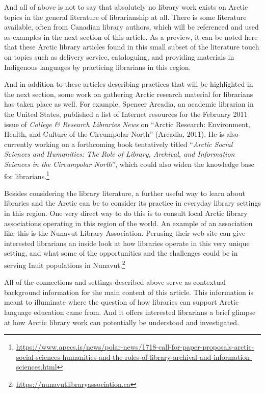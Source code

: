 \documentclass[a4paper,
fontsize=11pt,
oneside,
numbers=noperiodatend,
parskip=half-,
bibliography=totoc,
final
]{scrartcl}
\begin{document}
And all of above is not to say that absolutely no library work exists on
Arctic topics in the general literature of librarianship at all. There
is some literature available, often from Canadian library authors, which
will be referenced and used as examples in the next section of this
article. As a preview, it can be noted here that these Arctic library
articles found in this small subset of the literature touch on topics
such as delivery service, cataloguing, and providing materials in
Indigenous languages by practicing librarians in this region.

And in addition to these articles describing practices that will be
highlighted in the next section, some work on gathering Arctic research
material for librarians has taken place as well. For example, Spencer
Arcadia, an academic librarian in the United States, published a list of
Internet resources for the February 2011 issue of \emph{College \&
Research Libraries News} on \enquote{Arctic Research: Environment,
Health, and Culture of the Circumpolar North} (Arcadia, 2011). He is
also currently working on a forthcoming book tentatively titled
\enquote{\emph{Arctic Social Sciences and Humanities: The Role of
Library, Archival, and Information Sciences in the Circumpolar North}},
which could also widen the knowledge base for librarians.\footnote{\url{https://www.apecs.is/news/polar-news/1718-call-for-paper-proposals-arctic-social-sciences-humanities-and-the-roles-of-library-archival-and-information-sciences.html}}

Besides considering the library literature, a further useful way to
learn about libraries and the Arctic can be to consider its practice in
everyday library settings in this region. One very direct way to do this
is to consult local Arctic library associations operating in this region
of the world. An example of an association like this is the Nunavut
Library Association. Perusing their web site can give interested
librarians an inside look at how libraries operate in this very unique
setting, and what some of the opportunities and the challenges could be
in serving Inuit populations in Nunavut.\footnote{\url{https://nunavutlibraryassociation.ca}}

All of the connections and settings described above serve as contextual
background information for the main content of this article. This
information is meant to illuminate where the question of how libraries
can support Arctic language education came from. And it offers
interested librarians a brief glimpse at how Arctic library work can
potentially be understood and investigated.
\end{document}
